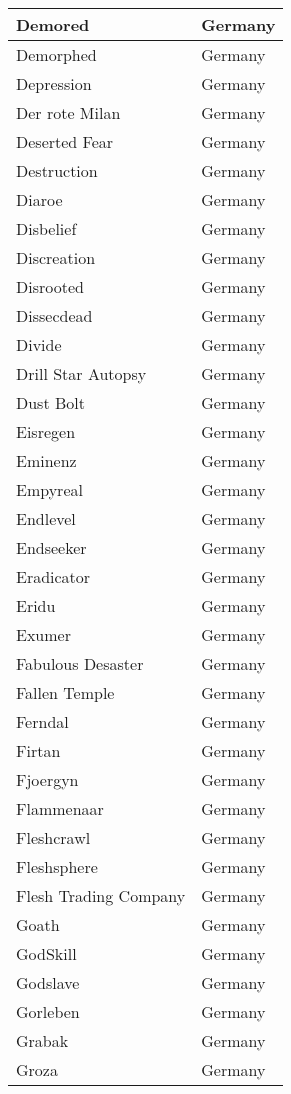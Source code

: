 \documentclass[12pt, a4paper, twoside]{report}
\begin{document}
\begin{center}
\begin{longtable}{|p{5cm}|p{5cm}|}
Demored & Germany \\ \hline
Demorphed & Germany \\ \hline
Depression & Germany \\ \hline
Der rote Milan & Germany \\ \hline
Deserted Fear & Germany \\ \hline
Destruction & Germany \\ \hline
Diaroe & Germany \\ \hline
Disbelief & Germany \\ \hline
Discreation & Germany \\ \hline
Disrooted & Germany \\ \hline
Dissecdead & Germany \\ \hline
Divide & Germany \\ \hline
Drill Star Autopsy & Germany \\ \hline
Dust Bolt & Germany \\ \hline
Eisregen & Germany \\ \hline
Eminenz & Germany \\ \hline
Empyreal & Germany \\ \hline
Endlevel & Germany \\ \hline
Endseeker & Germany \\ \hline
Eradicator & Germany \\ \hline
Eridu & Germany \\ \hline
Exumer & Germany \\ \hline
Fabulous Desaster & Germany \\ \hline
Fallen Temple & Germany \\ \hline
Ferndal & Germany \\ \hline
Firtan & Germany \\ \hline
Fjoergyn & Germany \\ \hline
Flammenaar & Germany \\ \hline
Fleshcrawl & Germany \\ \hline
Fleshsphere & Germany \\ \hline
Flesh Trading Company & Germany \\ \hline
Goath & Germany \\ \hline
GodSkill & Germany \\ \hline
Godslave & Germany \\ \hline
Gorleben & Germany \\ \hline
Grabak & Germany \\ \hline
Groza & Germany \\ \hline

\end{longtable}
\end{center}
\end{document}
